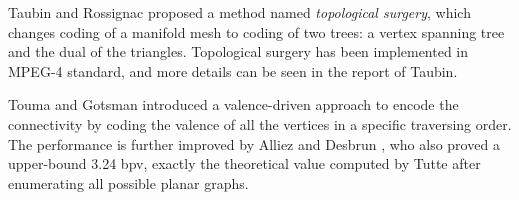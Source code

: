 \documentclass[11pt, a4paper]{report}
\begin{document}
    Taubin and Rossignac \cite{274365} proposed a method named
    \emph{topological surgery}, which changes coding of a manifold
    mesh to coding of two trees: 
    a vertex spanning tree and the dual of the triangles.
    Topological surgery has been implemented in MPEG-4 standard, and more details
    can be seen in the report of Taubin\cite{3d:Taubin}.

    
    Touma and Gotsman \cite{triangle:Touma} introduced a
    valence-driven approach to encode the connectivity by coding the
    valence of all the vertices in a specific traversing order. 
    The performance is further improved
    by Alliez and Desbrun \cite{alliez01valencedriven}, who also proved a
    upper-bound 3.24 bpv, exactly the theoretical value computed
    by Tutte \cite{census:Tutte} after enumerating all possible planar
    graphs.
\end{document}
